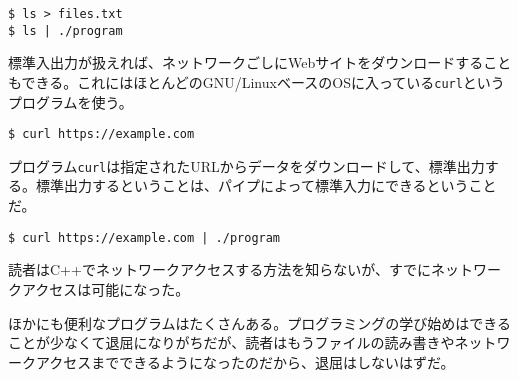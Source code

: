 \begin{lstlisting}[style=terminal]
$ ls > files.txt
$ ls | ./program
\end{lstlisting}

標準入出力が扱えれば、ネットワークごしにWebサイトをダウンロードすることもできる。これにはほとんどのGNU/LinuxベースのOSに入っている\texttt{curl}というプログラムを使う。

\begin{lstlisting}[style=terminal]
$ curl https://example.com
\end{lstlisting}

プログラム\texttt{curl}は指定されたURLからデータをダウンロードして、標準出力する。標準出力するということは、パイプによって標準入力にできるということだ。

\begin{lstlisting}[style=terminal]
$ curl https://example.com | ./program
\end{lstlisting}

読者はC++でネットワークアクセスする方法を知らないが、すでにネットワークアクセスは可能になった。

ほかにも便利なプログラムはたくさんある。プログラミングの学び始めはできることが少なくて退屈になりがちだが、読者はもうファイルの読み書きやネットワークアクセスまでできるようになったのだから、退屈はしないはずだ。
